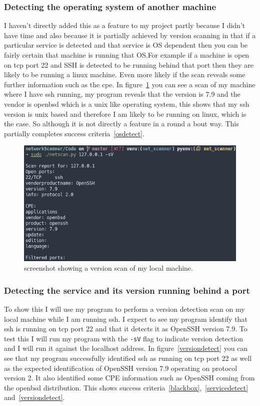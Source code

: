 \documentclass[titlepage]{article}
\let\Oldsubsubsection\subsubsection{}
\renewcommand{\subsubsection}{\FloatBarrier\Oldsubsubsection}
\begin{document}
\subsubsection{Detecting the operating system of another machine}
I haven't directly added this as a feature to my project partly because
I didn't have time and also because it is partially achieved by version
scanning in that if a particular service is detected and that service
is OS dependent then you can be fairly certain that machine is running
that OS.\@ For example if a machine is open on \gls{tcp} port 22
and SSH is detected to be running behind that port then they are likely
to be running a linux machine. Even more likely if the scan reveals some
further information such as the \gls{cpe}. In figure~\ref{sshversiondetect}
you can see a scan of my machine where I have \gls{ssh} running,
my program reveals that the version is 7.9 and the vendor is openbsd
which is a unix like operating system, this shows that my ssh version
is unix based and therefore I am likely to be running on linux, which is
the case. So although it is not directly a feature in a round a bout way.
This partially completes success criteria~\ref{osdetect}.

\begin{figure}[H]
  \centering
  \includegraphics[width=\textwidth]{sshversiondetect.png}
  \caption{%
    screenshot showing a version scan of my local machine.
  }\label{sshversiondetect}
\end{figure}

\subsubsection{Detecting the service and its version running behind a port}
To show this I will use my program to perform a version detection scan on my local machine
while I am running \gls{ssh}. I expect to see my program identify that \gls{ssh} is running
on \gls{tcp} port 22 and that it detects it as OpenSSH version 7.9. To test this
I will run my program with the \verb|-sV| flag to indicate version detection and
I will run it against the localhost address. In figure~\ref{versiondetect}
you can see that my program successfully identified \gls{ssh} as running on
\gls{tcp} port 22 as well as the expected identification of OpenSSH version 7.9
operating on protocol version 2.
It also identified some CPE information such as OpenSSH coming from the openbsd
distribution.
This shows success criteria~\ref{blackbox},~\ref{servicedetect} and~\ref{versiondetect}.
\end{document}
